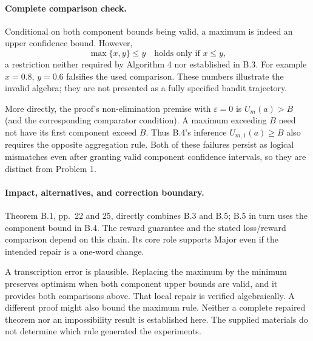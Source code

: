 \documentclass[10pt]{article}
\begin{document}
\paragraph*{Complete comparison check.}\mbox{}\par
Conditional on both component bounds being valid, a maximum is indeed an upper confidence bound. However, \[\max\{x,y\}\leq y \quad\text{holds only if }x\leq y,\] a restriction neither required by Algorithm 4 nor established in B.3. For example \(x=0.8\), \(y=0.6\) falsifies the used comparison. These numbers illustrate the invalid algebra; they are not presented as a fully specified bandit trajectory.\par
More directly, the proof’s non-elimination premise with \(\varepsilon=0\) is \(U_m(a)> B\) (and the corresponding comparator condition). A maximum exceeding \(B\) need not have its first component exceed \(B\). Thus B.4’s inference \(U_{m,1}(a)\geq B\) also requires the opposite aggregation rule. Both of these failures persist as logical mismatches even after granting valid component confidence intervals, so they are distinct from Problem 1.\par
\paragraph*{Impact, alternatives, and correction boundary.}\mbox{}\par
Theorem B.1, pp. 22 and 25, directly combines B.3 and B.5; B.5 in turn uses the component bound in B.4. The reward guarantee and the stated loss/reward comparison depend on this chain. Its core role supports Major even if the intended repair is a one-word change.\par
A transcription error is plausible. Replacing the maximum by the minimum preserves optimism when both component upper bounds are valid, and it provides both comparisons above. That local repair is verified algebraically. A different proof might also bound the maximum rule. Neither a complete repaired theorem nor an impossibility result is established here. The supplied materials do not determine which rule generated the experiments.\par
\end{document}
